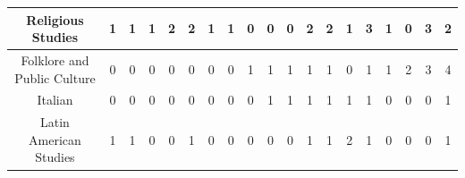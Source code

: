 \documentclass[10pt]{article}
\begin{document}
\begin{landscape}
\begin{longtable}[c]{|ccccccccccccccccccc|}
	\multicolumn{1}{|c|}{Religious Studies}                          & \multicolumn{1}{c|}{1}          & \multicolumn{1}{c|}{1}          & \multicolumn{1}{c|}{1}          & \multicolumn{1}{c|}{2}          & \multicolumn{1}{c|}{2}          & \multicolumn{1}{c|}{1}          & \multicolumn{1}{c|}{1}          & \multicolumn{1}{c|}{0}          & \multicolumn{1}{c|}{0}          & \multicolumn{1}{c|}{0}          & \multicolumn{1}{c|}{2}          & \multicolumn{1}{c|}{2}          & \multicolumn{1}{c|}{1}          & \multicolumn{1}{c|}{3}          & \multicolumn{1}{c|}{1}          & \multicolumn{1}{c|}{0}          & \multicolumn{1}{c|}{3}          & 2          \\ \hline
	\multicolumn{1}{|c|}{Folklore and Public Culture}                & \multicolumn{1}{c|}{0}          & \multicolumn{1}{c|}{0}          & \multicolumn{1}{c|}{0}          & \multicolumn{1}{c|}{0}          & \multicolumn{1}{c|}{0}          & \multicolumn{1}{c|}{0}          & \multicolumn{1}{c|}{0}          & \multicolumn{1}{c|}{1}          & \multicolumn{1}{c|}{1}          & \multicolumn{1}{c|}{1}          & \multicolumn{1}{c|}{1}          & \multicolumn{1}{c|}{1}          & \multicolumn{1}{c|}{0}          & \multicolumn{1}{c|}{1}          & \multicolumn{1}{c|}{1}          & \multicolumn{1}{c|}{2}          & \multicolumn{1}{c|}{3}          & 4          \\ \hline
	\multicolumn{1}{|c|}{Italian}                                    & \multicolumn{1}{c|}{0}          & \multicolumn{1}{c|}{0}          & \multicolumn{1}{c|}{0}          & \multicolumn{1}{c|}{0}          & \multicolumn{1}{c|}{0}          & \multicolumn{1}{c|}{0}          & \multicolumn{1}{c|}{0}          & \multicolumn{1}{c|}{0}          & \multicolumn{1}{c|}{1}          & \multicolumn{1}{c|}{1}          & \multicolumn{1}{c|}{1}          & \multicolumn{1}{c|}{1}          & \multicolumn{1}{c|}{1}          & \multicolumn{1}{c|}{1}          & \multicolumn{1}{c|}{0}          & \multicolumn{1}{c|}{0}          & \multicolumn{1}{c|}{0}          & 1          \\ \hline
	\multicolumn{1}{|c|}{Latin American Studies}                     & \multicolumn{1}{c|}{1}          & \multicolumn{1}{c|}{1}          & \multicolumn{1}{c|}{0}          & \multicolumn{1}{c|}{0}          & \multicolumn{1}{c|}{1}          & \multicolumn{1}{c|}{0}          & \multicolumn{1}{c|}{0}          & \multicolumn{1}{c|}{0}          & \multicolumn{1}{c|}{0}          & \multicolumn{1}{c|}{0}          & \multicolumn{1}{c|}{1}          & \multicolumn{1}{c|}{1}          & \multicolumn{1}{c|}{2}          & \multicolumn{1}{c|}{1}          & \multicolumn{1}{c|}{0}          & \multicolumn{1}{c|}{0}          & \multicolumn{1}{c|}{0}          & 1          \\ \hline

\end{longtable}
\end{landscape}
\end{document}
